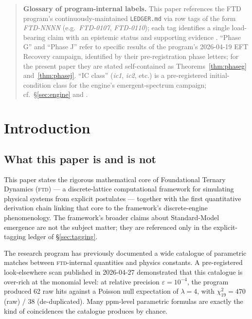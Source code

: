 \documentclass[11pt,reqno]{amsart}
\theoremstyle{plain}
\theoremstyle{definition}
\theoremstyle{remark}
\numberwithin{equation}{section}
\newcommand{\FTD}{\textsc{ftd}}
\begin{document}
\begin{quote}\small
\textbf{Glossary of program-internal labels.}
This paper references the FTD program's continuously-maintained
\texttt{LEDGER.md} via row tags of the form \emph{FTD-NNNN}
(e.g.\ \emph{FTD-0107}, \emph{FTD-0110}); each tag identifies a
single load-bearing claim with an epistemic status and supporting
evidence \cite{ledger}. ``Phase G'' and ``Phase J'' refer to specific
results of the program's 2026-04-19 EFT Recovery campaign, identified
by their pre-registration phase letters; for the present paper they
are stated self-contained as Theorems~\ref{thm:phaseg}
and~\ref{thm:phasej}. ``IC class'' (\emph{ic1}, \emph{ic2}, etc.) is
a pre-registered initial-condition class for the engine's
emergent-spectrum campaign; cf.\ \S\ref{sec:engine} and
\cite{emergentG1}.
\end{quote}

\bigskip

\tableofcontents
\newpage

\section{Introduction}
\label{sec:intro}

\subsection{What this paper is and is not}

This paper states the rigorous mathematical core of Foundational
Ternary Dynamics (\FTD) --- a discrete-lattice computational
framework for simulating physical systems from explicit postulates ---
together with the first quantitative derivation chain linking that core
to the framework's discrete-engine phenomenology. The framework's
broader claims about Standard-Model emergence are not the subject
matter; they are referenced only in the explicit-tagging ledger of
\S\ref{sec:tagging}.

The research program has previously documented a wide catalogue of
parametric matches between \FTD-internal quantities and physics
constants. A pre-registered look-elsewhere scan published in
2026-04-27 \cite{ledger,lookelsewhere} demonstrated that this
catalogue is over-rich at the monomial level: at relative
precision $\varepsilon = 10^{-4}$, the program produced 62 raw
hits against a Poisson null expectation of $\lambda = 4$, with
$\chi^{2}_{19} = 470$ (raw) / $38$ (de-duplicated). Many ppm-level
parametric formulas are exactly the kind of coincidences the
catalogue produces by chance.
\end{document}
